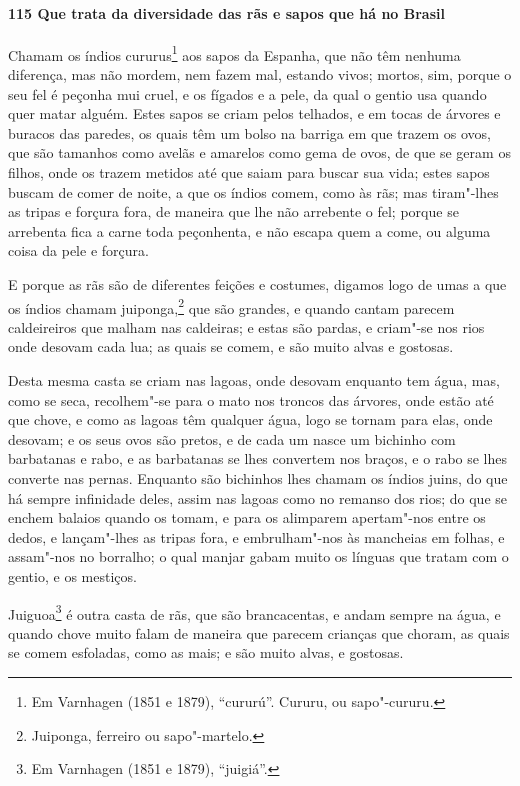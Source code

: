 \begin{linenumbers}
\paragraph{115 Que trata da diversidade das rãs e sapos que há no Brasil}\quad
Chamam os índios cururus\footnote{ Em Varnhagen (1851 e 1879), ``cururú''. Cururu, ou
sapo"-cururu.} aos sapos da Espanha, que não têm nenhuma diferença, mas não mordem, nem
fazem mal, estando vivos; mortos, sim, porque o seu fel é peçonha mui cruel, e os fígados
e a pele, da qual o gentio usa quando quer matar alguém. Estes sapos se criam pelos
telhados, e em tocas de árvores e buracos das paredes, os quais têm um bolso na barriga em
que trazem os ovos, que são tamanhos como avelãs e amarelos como gema de ovos, de que se
geram os filhos, onde os trazem metidos até que saiam para buscar sua vida; estes sapos
buscam de comer de noite, a que os índios comem, como às rãs; mas tiram"-lhes as tripas e
forçura fora, de maneira que lhe não arrebente o fel; porque se arrebenta fica a carne
toda peçonhenta, e não escapa quem a come, ou alguma coisa da pele e forçura.

E porque as rãs são de diferentes feições e costumes, digamos logo de umas a que os índios
chamam juiponga,\footnote{ Juiponga, ferreiro ou sapo"-martelo.} que são grandes, e quando
cantam parecem caldeireiros que malham nas caldeiras; e estas são pardas, e criam"-se nos
rios onde desovam cada lua; as quais se comem, e são muito alvas e gostosas.

Desta mesma casta se criam nas lagoas, onde desovam enquanto tem água, mas, como se seca,
recolhem"-se para o mato nos troncos das árvores, onde estão até que chove, e como as
lagoas têm qualquer água, logo se tornam para elas, onde desovam; e os seus ovos são
pretos, e de cada um nasce um bichinho com barbatanas e rabo, e as barbatanas se lhes
convertem nos braços, e o rabo se lhes converte nas pernas. Enquanto são bichinhos lhes
chamam os índios juins, do que há sempre infinidade deles, assim nas lagoas como no
remanso dos rios; do que se enchem balaios quando os tomam, e para os alimparem
apertam"-nos entre os dedos, e lançam"-lhes as tripas fora, e embrulham"-nos às mancheias em
folhas, e assam"-nos no borralho; o qual manjar gabam muito os línguas que tratam com o
gentio, e os mestiços.

Juiguoa\footnote{ Em Varnhagen (1851 e 1879), ``juigiá''.} é outra casta de rãs, que são
brancacentas, e andam sempre na água, e quando chove muito falam de maneira que parecem
crianças que choram, as quais se comem esfoladas, como as mais; e são muito alvas, e
gostosas.


\end{linenumbers}
